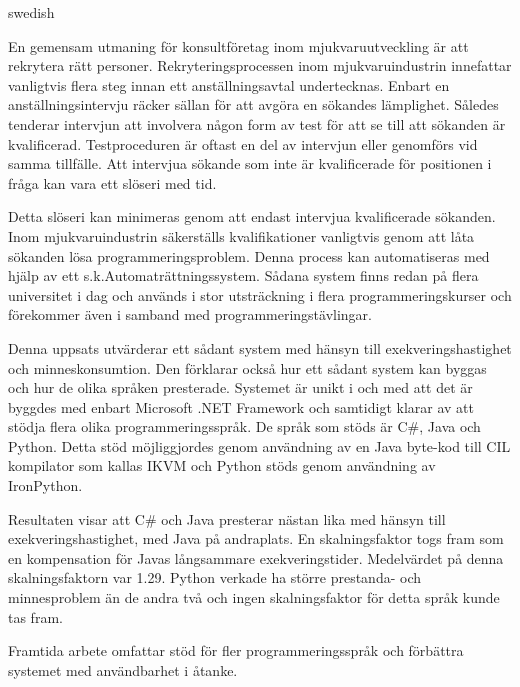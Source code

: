 \begin{foreignabstract}{swedish}

En gemensam utmaning för konsultföretag inom mjukvaruutveckling är att rekrytera rätt personer. Rekryteringsprocessen inom mjukvaruindustrin innefattar vanligtvis flera steg innan ett anställningsavtal undertecknas. Enbart en anställningsintervju räcker sällan för att avgöra en sökandes lämplighet. Således tenderar intervjun att involvera någon form av test för att se till att sökanden är kvalificerad. Testproceduren är oftast en del av intervjun eller genomförs vid samma tillfälle. Att intervjua sökande som inte är kvalificerade för positionen i fråga kan vara ett slöseri med tid.

Detta slöseri kan minimeras genom att endast intervjua kvalificerade sökanden. Inom mjukvaruindustrin säkerställs kvalifikationer vanligtvis genom att låta sökanden lösa programmeringsproblem. Denna process kan automatiseras med hjälp av ett s.k.Automaträttningssystem. Sådana system finns redan på flera universitet i dag och används i stor utsträckning i flera programmeringskurser och förekommer även i samband med programmeringstävlingar.

Denna uppsats utvärderar ett sådant system med hänsyn till exekveringshastighet och minneskonsumtion. Den förklarar också hur ett sådant system kan byggas och hur de olika språken presterade. Systemet är unikt i och med att det är byggdes med enbart Microsoft .NET Framework och samtidigt klarar av att stödja flera olika programmeringsspråk. De språk som stöds är C\#, Java och Python. Detta stöd möjliggjordes genom användning av en Java byte-kod till CIL kompilator som kallas IKVM och Python stöds genom användning av IronPython.

Resultaten visar att C\# och Java presterar nästan lika med hänsyn till exekveringshastighet, med Java på andraplats. En skalningsfaktor togs fram som en kompensation för Javas långsammare exekveringstider. Medelvärdet på denna skalningsfaktorn var 1.29. Python verkade ha större prestanda- och minnesproblem än de andra två och ingen skalningsfaktor för detta språk kunde tas fram.

Framtida arbete omfattar stöd för fler programmeringsspråk och förbättra systemet med användbarhet i åtanke.

\end{foreignabstract}
